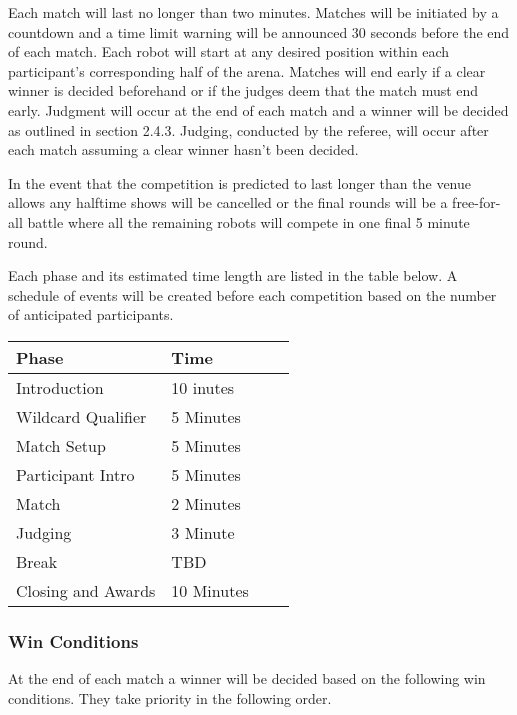 \documentclass{article}
\begin{document}
                		Each match will last no longer than two minutes. Matches will be initiated by a countdown and a time limit warning will be announced 30 seconds before the end of each match. Each robot will start at any desired position within each participant's corresponding half of the arena. Matches will end early if a clear winner is decided beforehand or if the judges deem that the match must end early. Judgment will occur at the end of each match and a winner will be decided as outlined in section 2.4.3. Judging, conducted by the referee, will occur after each match assuming a clear winner hasn't been decided.
		
              		  In the event that the competition is predicted to last longer than the venue allows any halftime shows will be cancelled or the final rounds will be a free-for-all battle where all the remaining robots will compete in one final 5 minute round.
                
			Each phase and its estimated time length are listed in the table below. A schedule of events will be created before each competition based on the number of anticipated participants.
                	
\begin{center}
    \begin{tabular}{| l | l | l | l |}
    \hline
    Phase & Time \\ \hline
    Introduction &  10 inutes \\ \hline
    Wildcard Qualifier & 5 Minutes\\ \hline
    Match Setup & 5 Minutes \\ \hline
    Participant Intro & 5 Minutes  \\    \hline
    Match &  2 Minutes \\    \hline
    Judging &  3 Minute \\    \hline
    Break &  TBD \\    \hline
    Closing and Awards &  10 Minutes \\    \hline
    \end{tabular}
\end{center}



		\subsubsection {Win Conditions}	
				
			At the end of each match a winner will be decided based on the following win conditions. They take priority in the following order.
				
\end{document}

